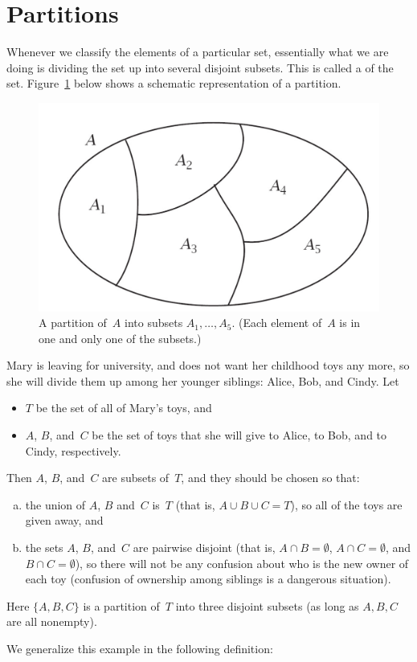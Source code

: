 \section{Partitions}  \label{EquivalenceRelationsPartitionsSect}

Whenever we classify the elements of a particular set, essentially what we are doing is dividing the set up into several disjoint subsets. This is called a   of the set. Figure~\ref{partitionfig} below shows a schematic representation of a partition.

\begin{center}
\begin{figure}[ht]
\label{partitionfig}
\includegraphics[scale=0.35]{images/partition.pdf}
\caption{A partition of~$A$ into subsets $A_1, \ldots, A_5$. 
(Each element of~$A$ is in one and only one of the subsets.)}
\end{figure}
\end{center}


\begin{eg} \label{ToyPartitionEg}
Mary is leaving for university, and does not want her childhood toys any more, so she will divide them up among her younger siblings: Alice, Bob, and Cindy. Let 
\begin{itemize}
\item $T$ be the set of all of Mary's toys, 
and
\item $A$, $B$, and~$C$ be the set of toys that she will give to Alice, to Bob, and to Cindy, respectively.
\end{itemize}
Then $A$, $B$, and~$C$ are subsets of~$T$, and they should be chosen so that:
\begin{enumerate}[(a)]
\item the union of $A$, $B$ and~$C$ is~$T$ (that is, $A \cup B \cup C = T$), so all of the toys are given away,
and
\item the sets $A$, $B$, and~$C$ are pairwise disjoint (that is, $A \cap B = \emptyset$, $A \cap C = \emptyset$, and $B \cap C = \emptyset$), so there will not be any confusion about who is the new owner of each toy (confusion of ownership among siblings is a dangerous situation).
\end{enumerate}
Here $\{A, B, C\}$ is a  partition of~$T$ into three disjoint subsets (as long as $A, B, C$ are all nonempty). 
\end{eg}
We generalize this example in the following definition:

